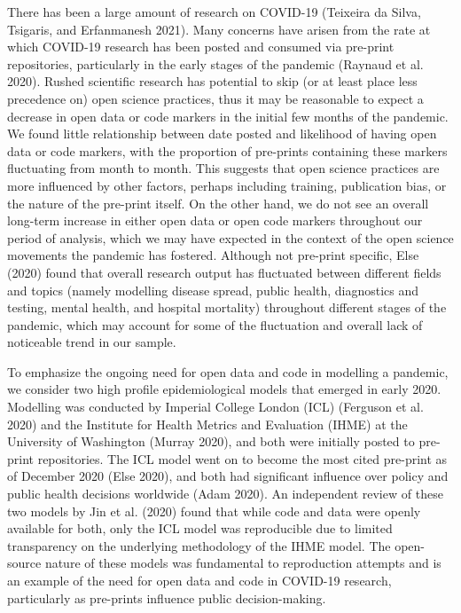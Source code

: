 \documentclass[
]{article}
\begin{document}
There has been a large amount of research on COVID-19 (Teixeira da Silva, Tsigaris, and Erfanmanesh 2021). Many concerns have arisen from the rate at which COVID-19 research has been posted and consumed via pre-print repositories, particularly in the early stages of the pandemic (Raynaud et al. 2020). Rushed scientific research has potential to skip (or at least place less precedence on) open science practices, thus it may be reasonable to expect a decrease in open data or code markers in the initial few months of the pandemic. We found little relationship between date posted and likelihood of having open data or code markers, with the proportion of pre-prints containing these markers fluctuating from month to month. This suggests that open science practices are more influenced by other factors, perhaps including training, publication bias, or the nature of the pre-print itself. On the other hand, we do not see an overall long-term increase in either open data or open code markers throughout our period of analysis, which we may have expected in the context of the open science movements the pandemic has fostered. Although not pre-print specific, Else (2020) found that overall research output has fluctuated between different fields and topics (namely modelling disease spread, public health, diagnostics and testing, mental health, and hospital mortality) throughout different stages of the pandemic, which may account for some of the fluctuation and overall lack of noticeable trend in our sample.

To emphasize the ongoing need for open data and code in modelling a pandemic, we consider two high profile epidemiological models that emerged in early 2020. Modelling was conducted by Imperial College London (ICL) (Ferguson et al. 2020) and the Institute for Health Metrics and Evaluation (IHME) at the University of Washington (Murray 2020), and both were initially posted to pre-print repositories. The ICL model went on to become the most cited pre-print as of December 2020 (Else 2020), and both had significant influence over policy and public health decisions worldwide (Adam 2020). An independent review of these two models by Jin et al. (2020) found that while code and data were openly available for both, only the ICL model was reproducible due to limited transparency on the underlying methodology of the IHME model. The open-source nature of these models was fundamental to reproduction attempts and is an example of the need for open data and code in COVID-19 research, particularly as pre-prints influence public decision-making.
\end{document}
